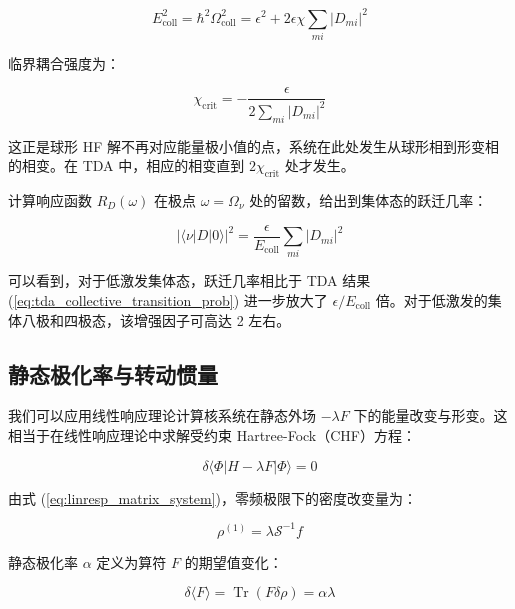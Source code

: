 \begin{equation}
E^{2}_{\text{coll}}=\hbar^{2}\Omega^{2}_{\text{coll}}=\epsilon^{2}+2\epsilon\chi\sum_{mi}|D_{mi}|^{2}\label{eq:linresp_degenerate_energy_squared}
\end{equation}

临界耦合强度为：

\begin{equation}
\chi_{\text{crit}}=-\frac{\epsilon}{2\sum_{mi}|D_{mi}|^{2}}\label{eq:linresp_critical_coupling}
\end{equation}

这正是球形 HF 解不再对应能量极小值的点，系统在此处发生从球形相到形变相的相变。在 TDA 中，相应的相变直到 $2\chi_{\text{crit}}$
处才发生。

计算响应函数 $R_{D}(\omega)$ 在极点 $\omega=\Omega_{\nu}$ 处的留数，给出到集体态的跃迁几率：

\begin{equation}
|\langle\nu|D|0\rangle|^{2}=\frac{\epsilon}{E_{\text{coll}}}\sum_{mi}|D_{mi}|^{2}\label{eq:linresp_enhanced_transition_prob}
\end{equation}

可以看到，对于低激发集体态，跃迁几率相比于 TDA 结果 (\ref{eq:tda_collective_transition_prob})
进一步放大了 $\epsilon/E_{\text{coll}}$ 倍。对于低激发的集体八极和四极态，该增强因子可高达 2 左右。

\subsection{静态极化率与转动惯量\label{subsec:8.5.3_=009759=006001=006781=005316=007387=004E0E=008F6C=0052A8=0060EF=0091CF}}

我们可以应用线性响应理论计算核系统在静态外场 $-\lambda F$ 下的能量改变与形变。这相当于在线性响应理论中求解受约束 Hartree-Fock（CHF）方程：

\begin{equation}
\delta\langle\Phi|H-\lambda F|\Phi\rangle=0\label{eq:linresp_chf_equation}
\end{equation}

由式 (\ref{eq:linresp_matrix_system})，零频极限下的密度改变量为：

\begin{equation}
\rho^{(1)}=\lambda\mathcal{S}^{-1}f\label{eq:linresp_static_density_response}
\end{equation}

静态极化率 $\alpha$ 定义为算符 $F$ 的期望值变化：

\begin{equation}
\delta\langle F\rangle=\operatorname{Tr}(F\delta\rho)=\alpha\lambda\label{eq:linresp_polarizability_def}
\end{equation}

